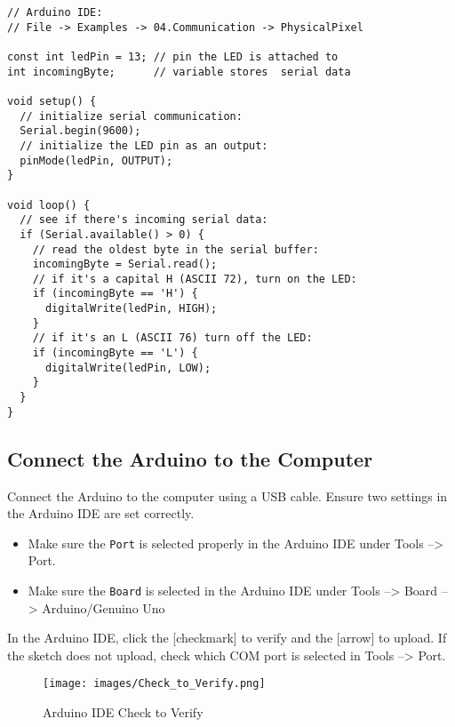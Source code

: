 \documentclass{book}
\makeatletter
\def\maxwidth{\ifdim\Gin@nat@width>\linewidth\linewidth
\else\Gin@nat@width\fi}
\let\Oldincludegraphics\includegraphics
\renewcommand{\includegraphics}[1]{\Oldincludegraphics[width=.8\maxwidth]{#1}}
\providecommand{\tightlist}{%
      \setlength{\itemsep}{0pt}\setlength{\parskip}{0pt}}
\newcommand{\passthrough}[1]{#1}
\makeatother
\begin{document}
    
        \begin{lstlisting}
// Arduino IDE: 
// File -> Examples -> 04.Communication -> PhysicalPixel

const int ledPin = 13; // pin the LED is attached to
int incomingByte;      // variable stores  serial data

void setup() {
  // initialize serial communication:
  Serial.begin(9600);
  // initialize the LED pin as an output:
  pinMode(ledPin, OUTPUT);
}

void loop() {
  // see if there's incoming serial data:
  if (Serial.available() > 0) {
    // read the oldest byte in the serial buffer:
    incomingByte = Serial.read();
    // if it's a capital H (ASCII 72), turn on the LED:
    if (incomingByte == 'H') {
      digitalWrite(ledPin, HIGH);
    }
    // if it's an L (ASCII 76) turn off the LED:
    if (incomingByte == 'L') {
      digitalWrite(ledPin, LOW);
    }
  }
}
\end{lstlisting}
    




    
        \hypertarget{connect-the-arduino-to-the-computer}{%
\subsection{Connect the Arduino to the
Computer}\label{connect-the-arduino-to-the-computer}}
    




    
        Connect the Arduino to the computer using a USB cable. Ensure two
settings in the Arduino IDE are set correctly.

\begin{itemize}
\tightlist
\item
  Make sure the \passthrough{\lstinline!Port!} is selected properly in
  the Arduino IDE under Tools --\textgreater{} Port.
\item
  Make sure the \passthrough{\lstinline!Board!} is selected in the
  Arduino IDE under Tools --\textgreater{} Board --\textgreater{}
  Arduino/Genuino Uno
\end{itemize}

In the Arduino IDE, click the {[}checkmark{]} to verify and the
{[}arrow{]} to upload. If the sketch does not upload, check which COM
port is selected in Tools --\textgreater{} Port.

\begin{figure}
\centering
\texttt{[image: images/Check\_to\_Verify.png]}
\caption{Arduino IDE Check to Verify}
\end{figure}
\end{document}
